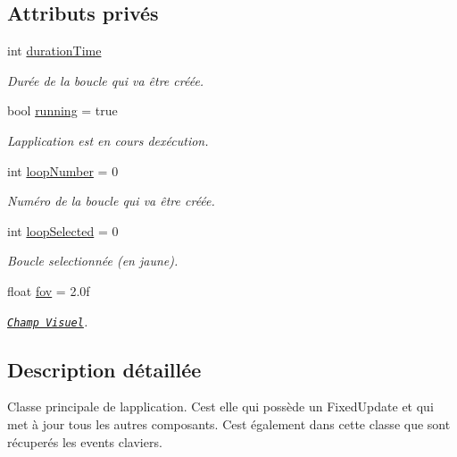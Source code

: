 \subsection*{Attributs privés}
\begin{DoxyCompactItemize}
\item 
int \hyperlink{class_music_a477118c7507d4eca7c99d5d431e91ddd}{duration\+Time}
\begin{DoxyCompactList}\small\item\em Durée de la boucle qui va être créée. \end{DoxyCompactList}\item 
bool \hyperlink{class_music_a0a0e48756d3ed859fd7bba17aa529732}{running} = true
\begin{DoxyCompactList}\small\item\em L\textquotesingle{}application est en cours d\textquotesingle{}exécution. \end{DoxyCompactList}\item 
int \hyperlink{class_music_a89ea80578a05f37ffefe4f83d6be0425}{loop\+Number} = 0
\begin{DoxyCompactList}\small\item\em Numéro de la boucle qui va être créée. \end{DoxyCompactList}\item 
int \hyperlink{class_music_a314e1e14f9b0f2fc88672df0a54ceda2}{loop\+Selected} = 0
\begin{DoxyCompactList}\small\item\em Boucle selectionnée (en jaune). \end{DoxyCompactList}\item 
float \hyperlink{class_music_adf1ab3cb19a41e9e4eed57e41a420426}{fov} = 2.\+0f
\begin{DoxyCompactList}\small\item\em \href{http://docs.unity3d.com/ScriptReference/Camera-fieldOfView.html}{\tt Champ Visuel}. \end{DoxyCompactList}\end{DoxyCompactItemize}


\subsection{Description détaillée}
Classe principale de l\textquotesingle{}application. C\textquotesingle{}est elle qui possède un Fixed\+Update et qui met à jour tous les autres composants. C\textquotesingle{}est également dans cette classe que sont récuperés les events claviers. 



